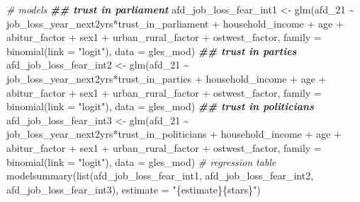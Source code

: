 \documentclass[
]{article}
\newenvironment{Shaded}{\begin{snugshade}}{\end{snugshade}}
\newcommand{\AttributeTok}[1]{\textcolor[rgb]{0.77,0.63,0.00}{#1}}
\newcommand{\CommentTok}[1]{\textcolor[rgb]{0.56,0.35,0.01}{\textit{#1}}}
\newcommand{\DocumentationTok}[1]{\textcolor[rgb]{0.56,0.35,0.01}{\textbf{\textit{#1}}}}
\newcommand{\FunctionTok}[1]{\textcolor[rgb]{0.00,0.00,0.00}{#1}}
\newcommand{\NormalTok}[1]{#1}
\newcommand{\OtherTok}[1]{\textcolor[rgb]{0.56,0.35,0.01}{#1}}
\newcommand{\SpecialCharTok}[1]{\textcolor[rgb]{0.00,0.00,0.00}{#1}}
\newcommand{\StringTok}[1]{\textcolor[rgb]{0.31,0.60,0.02}{#1}}
\begin{document}
\begin{Shaded}
\begin{Highlighting}[]
\CommentTok{\# models }
\DocumentationTok{\#\# trust in parliament}
\NormalTok{afd\_job\_loss\_fear\_int1 }\OtherTok{\textless{}{-}} \FunctionTok{glm}\NormalTok{(afd\_21 }\SpecialCharTok{\textasciitilde{}}\NormalTok{ job\_loss\_year\_next2yrs}\SpecialCharTok{*}\NormalTok{trust\_in\_parliament }\SpecialCharTok{+}\NormalTok{ household\_income }\SpecialCharTok{+}\NormalTok{ age }\SpecialCharTok{+}\NormalTok{ abitur\_factor }\SpecialCharTok{+}\NormalTok{ sex1 }\SpecialCharTok{+}\NormalTok{ urban\_rural\_factor }\SpecialCharTok{+}\NormalTok{ ostwest\_factor, }
                             \AttributeTok{family =} \FunctionTok{binomial}\NormalTok{(}\AttributeTok{link =} \StringTok{"logit"}\NormalTok{),}
                             \AttributeTok{data =}\NormalTok{ gles\_mod)}
\DocumentationTok{\#\# trust in parties }
\NormalTok{afd\_job\_loss\_fear\_int2 }\OtherTok{\textless{}{-}} \FunctionTok{glm}\NormalTok{(afd\_21 }\SpecialCharTok{\textasciitilde{}}\NormalTok{ job\_loss\_year\_next2yrs}\SpecialCharTok{*}\NormalTok{trust\_in\_parties }\SpecialCharTok{+}\NormalTok{ household\_income }\SpecialCharTok{+}\NormalTok{ age }\SpecialCharTok{+}\NormalTok{ abitur\_factor }\SpecialCharTok{+}\NormalTok{ sex1 }\SpecialCharTok{+}\NormalTok{ urban\_rural\_factor }\SpecialCharTok{+}\NormalTok{ ostwest\_factor, }
                             \AttributeTok{family =} \FunctionTok{binomial}\NormalTok{(}\AttributeTok{link =} \StringTok{"logit"}\NormalTok{),}
                             \AttributeTok{data =}\NormalTok{ gles\_mod)}
\DocumentationTok{\#\# trust in politicians}
\NormalTok{afd\_job\_loss\_fear\_int3 }\OtherTok{\textless{}{-}} \FunctionTok{glm}\NormalTok{(afd\_21 }\SpecialCharTok{\textasciitilde{}}\NormalTok{ job\_loss\_year\_next2yrs}\SpecialCharTok{*}\NormalTok{trust\_in\_politicians }\SpecialCharTok{+}\NormalTok{ household\_income }\SpecialCharTok{+}\NormalTok{ age }\SpecialCharTok{+}\NormalTok{ abitur\_factor }\SpecialCharTok{+}\NormalTok{ sex1 }\SpecialCharTok{+}\NormalTok{ urban\_rural\_factor }\SpecialCharTok{+}\NormalTok{ ostwest\_factor, }
                             \AttributeTok{family =} \FunctionTok{binomial}\NormalTok{(}\AttributeTok{link =} \StringTok{"logit"}\NormalTok{),}
                             \AttributeTok{data =}\NormalTok{ gles\_mod)}
\CommentTok{\# regression table }
\FunctionTok{modelsummary}\NormalTok{(}\FunctionTok{list}\NormalTok{(afd\_job\_loss\_fear\_int1, afd\_job\_loss\_fear\_int2, afd\_job\_loss\_fear\_int3),}
             \AttributeTok{estimate =} \StringTok{"\{estimate\}\{stars\}"}\NormalTok{)}
\end{Highlighting}
\end{Shaded}
\end{document}
